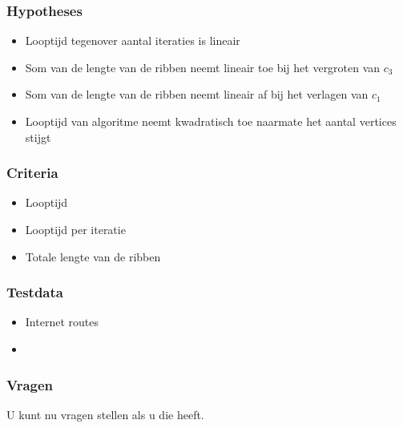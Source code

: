 \documentclass[16pt]{beamer}
\begin{document}
\begin{frame}
    \frametitle{Hypotheses}
    \begin{itemize}
        \item{Looptijd tegenover aantal iteraties is lineair}
        \item{Som van de lengte van de ribben neemt lineair toe bij het vergroten van $c_3$}
        \item{Som van de lengte van de ribben neemt lineair af bij het verlagen van $c_1$}
        \item{Looptijd van algoritme neemt kwadratisch toe naarmate het aantal vertices stijgt}
    \end{itemize}
\end{frame}

\begin{frame}
    \frametitle{Criteria}
    \begin{itemize}
        \item{Looptijd}
        \item{Looptijd per iteratie}
        \item{Totale lengte van de ribben}
    \end{itemize}
\end{frame}

\begin{frame}
    \frametitle{Testdata}
    \begin{itemize}
        \item{Internet routes}
        \item{}
    \end{itemize}
\end{frame}

\begin{frame}
    \frametitle{Vragen}
    U kunt nu vragen stellen als u die heeft.
\end{frame}
\end{document}
